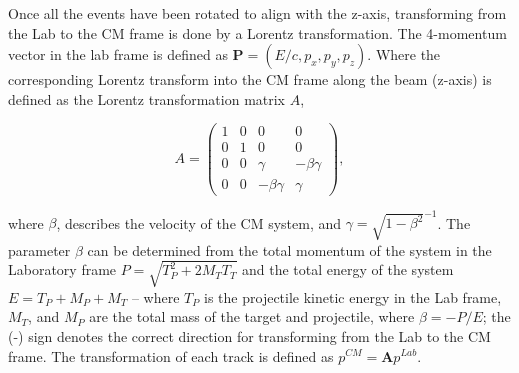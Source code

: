 Once all the events have been rotated to align with the z-axis, transforming from the Lab to the CM frame is done by a Lorentz transformation. The 4-momentum vector in the lab frame is defined as $\textbf{P} = (E/c,p_x,p_y,p_z)$. Where the corresponding Lorentz transform into the CM frame along the beam (z-axis) is defined as the Lorentz transformation matrix $A$,

\begin{equation}
A = \begin{pmatrix}
1 & 0 & 0 & 0\\
0 & 1 & 0 & 0\\
0 & 0 & \gamma & -\beta \gamma\\
0 & 0 & -\beta \gamma & \gamma
\end{pmatrix},
\end{equation}

where $\beta$, describes the velocity of the CM system, and $\gamma=\sqrt{1-\beta^2}^{-1}$. The parameter $\beta$ can be determined from the total momentum of the system in the Laboratory frame $P = \sqrt{ T_{P}^2 + 2M_{T}T_{T}}$ and the total energy of the system $E = T_{P} + M_{P} + M_{T}$ -- where $T_{P}$ is the projectile kinetic energy in the Lab frame, $M_{T}$, and $M_{P}$ are the total mass of the target and projectile, where $\beta = -P/E$; the (-) sign denotes the correct direction for transforming from the Lab to the CM frame. The transformation of each  track is defined as $p^{CM} = \textbf{A}p^{Lab}$.
